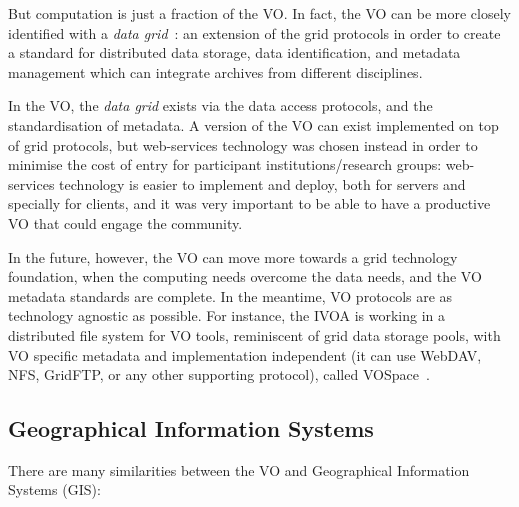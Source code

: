 		 But computation is just a fraction of the VO. In fact, the
		VO can be more closely identified with a \emph{data
		grid}~\cite{Chervenak:2001rr}: an extension of the grid
		protocols in order to create a standard for distributed
		data storage, data identification, and metadata management
		which can integrate archives from different disciplines.
		
		 In the VO, the \emph{data grid} exists via the data access
		protocols, and the standardisation of metadata. A version
		of the VO can exist implemented on top of grid protocols,
		but web-services technology was chosen instead in order to
		minimise the cost of entry for participant
		institutions/research groups: web-services technology is
		easier to implement and deploy, both for servers and
		specially for clients, and it was very important to be able
		to have a productive VO that could engage the community.
		
		 In the future, however, the VO can move more towards a
		grid technology foundation, when the computing needs
		overcome the data needs, and the VO metadata standards are
		complete. In the meantime, VO protocols are as technology
		agnostic as possible. For instance, the IVOA is working in
		a distributed file system for VO tools, reminiscent of grid
		data storage pools, with VO specific metadata and
		implementation independent (it can use WebDAV, NFS,
		GridFTP, or any other supporting protocol), called
		VOSpace~\cite{2008vospcivoav1013G}.
	
	\subsection{Geographical Information Systems} %
	\label{sub:geographical_information_systems}
	
		There are many similarities between the VO and 
		Geographical Information Systems (GIS):
	
